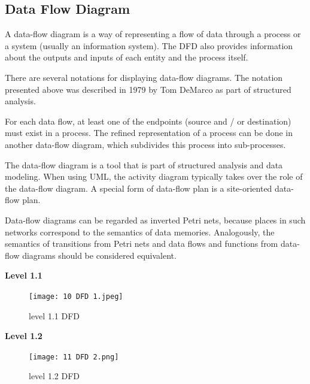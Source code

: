 \documentclass[12pt]{article}
\begin{document}
\begin{enumerate}
\subsection{Data Flow Diagram}

A data-flow diagram is a way of representing a flow of data through a process or a system (usually an information system). The DFD also provides information about the outputs and inputs of each entity and the process itself. 

There are several notations for displaying data-flow diagrams. The notation presented above was described in 1979 by Tom DeMarco as part of structured analysis.

For each data flow, at least one of the endpoints (source and / or destination) must exist in a process. The refined representation of a process can be done in another data-flow diagram, which subdivides this process into sub-processes.

The data-flow diagram is a tool that is part of structured analysis and data modeling. When using UML, the activity diagram typically takes over the role of the data-flow diagram. A special form of data-flow plan is a site-oriented data-flow plan.

Data-flow diagrams can be regarded as inverted Petri nets, because places in such networks correspond to the semantics of data memories. Analogously, the semantics of transitions from Petri nets and data flows and functions from data-flow diagrams should be considered equivalent.







\begin{flushleft}\textbf{Level 1.1}\end{flushleft}


\begin{figure}[h!]
\begin{center}
\texttt{[image: 10 DFD 1.jpeg]}
\caption{ level 1.1 DFD}
\end{center}
\end{figure}


\newpage

\begin{flushleft}\textbf{Level 1.2}\end{flushleft}


\begin{figure}[h!]
\begin{center}
\texttt{[image: 11 DFD 2.png]}
\caption{level 1.2 DFD}
\end{center}
\end{figure}



\end{enumerate}
\end{document}

